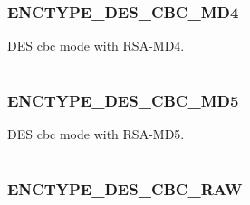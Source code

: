 \documentclass[letterpaper,10pt,english]{sphinxmanual}
\begin{document}
\subsubsection{ENCTYPE\_DES\_CBC\_MD4}
\label{appdev/refs/macros/ENCTYPE_DES_CBC_MD4:enctype-des-cbc-md4-data}\label{appdev/refs/macros/ENCTYPE_DES_CBC_MD4::doc}\label{appdev/refs/macros/ENCTYPE_DES_CBC_MD4:enctype-des-cbc-md4}

\begin{fulllineitems}
\label{appdev/refs/macros/ENCTYPE_DES_CBC_MD4:ENCTYPE_DES_CBC_MD4}
\end{fulllineitems}


DES cbc mode with RSA-MD4.

\begin{tabulary}{\linewidth}{|L|L|}
\hline

 & 
\\
\hline\end{tabulary}



\subsubsection{ENCTYPE\_DES\_CBC\_MD5}
\label{appdev/refs/macros/ENCTYPE_DES_CBC_MD5:enctype-des-cbc-md5-data}\label{appdev/refs/macros/ENCTYPE_DES_CBC_MD5::doc}\label{appdev/refs/macros/ENCTYPE_DES_CBC_MD5:enctype-des-cbc-md5}

\begin{fulllineitems}
\label{appdev/refs/macros/ENCTYPE_DES_CBC_MD5:ENCTYPE_DES_CBC_MD5}
\end{fulllineitems}


DES cbc mode with RSA-MD5.

\begin{tabulary}{\linewidth}{|L|L|}
\hline

 & 
\\
\hline\end{tabulary}



\subsubsection{ENCTYPE\_DES\_CBC\_RAW}
\label{appdev/refs/macros/ENCTYPE_DES_CBC_RAW:enctype-des-cbc-raw-data}\label{appdev/refs/macros/ENCTYPE_DES_CBC_RAW:enctype-des-cbc-raw}\label{appdev/refs/macros/ENCTYPE_DES_CBC_RAW::doc}
\end{document}
